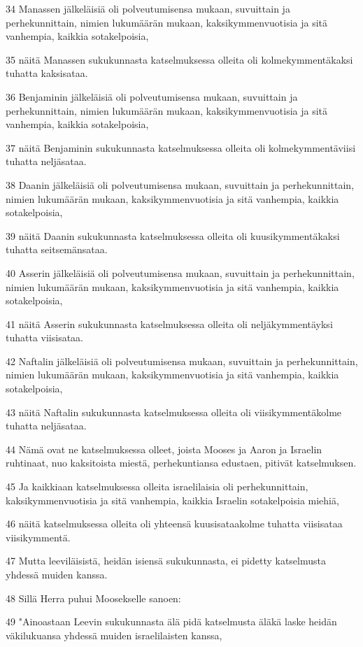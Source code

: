 \par 34 Manassen jälkeläisiä oli polveutumisensa mukaan, suvuittain ja perhekunnittain, nimien lukumäärän mukaan, kaksikymmenvuotisia ja sitä vanhempia, kaikkia sotakelpoisia,
\par 35 näitä Manassen sukukunnasta katselmuksessa olleita oli kolmekymmentäkaksi tuhatta kaksisataa.
\par 36 Benjaminin jälkeläisiä oli polveutumisensa mukaan, suvuittain ja perhekunnittain, nimien lukumäärän mukaan, kaksikymmenvuotisia ja sitä vanhempia, kaikkia sotakelpoisia,
\par 37 näitä Benjaminin sukukunnasta katselmuksessa olleita oli kolmekymmentäviisi tuhatta neljäsataa.
\par 38 Daanin jälkeläisiä oli polveutumisensa mukaan, suvuittain ja perhekunnittain, nimien lukumäärän mukaan, kaksikymmenvuotisia ja sitä vanhempia, kaikkia sotakelpoisia,
\par 39 näitä Daanin sukukunnasta katselmuksessa olleita oli kuusikymmentäkaksi tuhatta seitsemänsataa.
\par 40 Asserin jälkeläisiä oli polveutumisensa mukaan, suvuittain ja perhekunnittain, nimien lukumäärän mukaan, kaksikymmenvuotisia ja sitä vanhempia, kaikkia sotakelpoisia,
\par 41 näitä Asserin sukukunnasta katselmuksessa olleita oli neljäkymmentäyksi tuhatta viisisataa.
\par 42 Naftalin jälkeläisiä oli polveutumisensa mukaan, suvuittain ja perhekunnittain, nimien lukumäärän mukaan, kaksikymmenvuotisia ja sitä vanhempia, kaikkia sotakelpoisia,
\par 43 näitä Naftalin sukukunnasta katselmuksessa olleita oli viisikymmentäkolme tuhatta neljäsataa.
\par 44 Nämä ovat ne katselmuksessa olleet, joista Mooses ja Aaron ja Israelin ruhtinaat, nuo kaksitoista miestä, perhekuntiansa edustaen, pitivät katselmuksen.
\par 45 Ja kaikkiaan katselmuksessa olleita israelilaisia oli perhekunnittain, kaksikymmenvuotisia ja sitä vanhempia, kaikkia Israelin sotakelpoisia miehiä,
\par 46 näitä katselmuksessa olleita oli yhteensä kuusisataakolme tuhatta viisisataa viisikymmentä.
\par 47 Mutta leeviläisistä, heidän isiensä sukukunnasta, ei pidetty katselmusta yhdessä muiden kanssa.
\par 48 Sillä Herra puhui Moosekselle sanoen:
\par 49 "Ainoastaan Leevin sukukunnasta älä pidä katselmusta äläkä laske heidän väkilukuansa yhdessä muiden israelilaisten kanssa,
